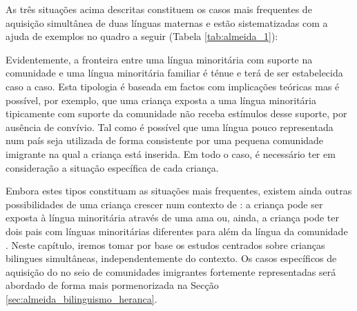 \documentclass[output=paper]{LSP/langsci}
\begin{document}
As três situações acima descritas constituem os casos mais frequentes de aquisição simultânea de duas línguas maternas \citep{genesee_etal2004} e estão sistematizadas com a ajuda de exemplos no quadro a seguir (Tabela \ref{tab:almeida_1}):

\begin{table}[ht]
\centering
{}
\caption{Tipos e exemplos de situações de bilinguismo}
\label{tab:almeida_1}
\end{table}

Evidentemente, a fronteira entre uma língua minoritária com suporte na comunidade e uma língua minoritária familiar é ténue e terá de ser estabelecida caso a caso. Esta tipologia é baseada em factos com implicações teóricas mas é possível, por exemplo, que uma criança exposta a uma língua minoritária tipicamente com suporte da comunidade não receba estímulos desse suporte, por ausência de convívio. Tal como é possível que uma língua pouco representada num país seja utilizada de forma consistente por uma pequena comunidade imigrante na qual a criança está inserida. Em todo o caso, é necessário ter em consideração a situação específica de cada criança. 

Embora estes tipos constituam as situações mais frequentes, existem ainda outras possibilidades de uma criança crescer num contexto de : a criança pode ser exposta à língua minoritária através de uma ama ou, ainda, a criança pode ter dois pais com línguas minoritárias diferentes para além da língua da comunidade \citep{cruz-ferreira2006}. Neste capítulo, iremos tomar por base os estudos centrados sobre crianças bilingues simultâneas, independentemente do contexto. Os casos específicos de aquisição do  no seio de comunidades imigrantes fortemente representadas será abordado de forma mais pormenorizada na Secção \ref{sec:almeida_bilinguismo_heranca}.
\end{document}
